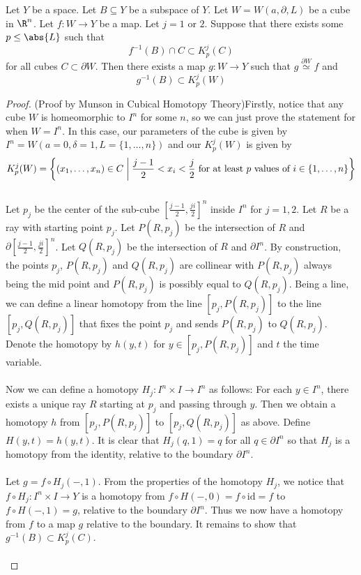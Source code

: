 \documentclass[a4paper]{article}
\begin{document}
\begin{lmm}{}{} Let $Y$ be a space. Let $B\subseteq Y$ be a subspace of $Y$. Let $W=W(a,\partial, L)$ be a cube in $\R^n$. Let $f:W\to Y$ be a map. Let $j=1$ or $2$. Suppose that there exists some $p\leq\abs{L}$ such that $$f^{-1}(B)\cap C\subset K_p^j(C)$$ for all cubes $C\subset\partial W$. Then there exists a map $g:W\to Y$ such that $g\overset{\partial W}{\simeq} f$ and $$g^{-1}(B)\subset K_p^j(W)$$ 
\begin{proof}
(Proof by Munson in Cubical Homotopy Theory)Firstly, notice that any cube $W$ is homeomorphic to $I^n$ for some $n$, so we can just prove the statement for when $W=I^n$. In this case, our parameters of the cube is given by $I^n=W(a=0,\delta=1,L=\{1,\dots,n\})$ and our $K_p^j(W)$ is given by $$K_p^j(W)=\left\{(x_1,\dots,x_n)\in C\;\bigg{|}\;\frac{j-1}{2}<x_i<\frac{j}{2}\text{ for at least }p\text{ values of }i\in\{1,\dots,n\}\right\}$$~\\

Let $p_j$ be the center of the sub-cube $\left[\frac{j-1}{2},\frac{ji}{2}\right]^n$ inside $I^n$ for $j=1,2$. Let $R$ be a ray with starting point $p_j$. Let $P(R,p_j)$ be the intersection of $R$ and $\partial\left[\frac{j-1}{2},\frac{ji}{2}\right]^n$. Let $Q(R,p_j)$ be the intersection of $R$ and $\partial I^n$. By construction, the points $p_j$, $P(R,p_j)$ and $Q(R,p_j)$ are collinear with $P(R,p_j)$ always being the mid point and $P(R,p_j)$ is possibly equal to $Q(R,p_j)$. Being a line, we can define a linear homotopy from the line $[p_j,P(R,p_j)]$ to the line $[p_j,Q(R,p_j)]$ that fixes the point $p_j$ and sends $P(R,p_j)$ to $Q(R,p_j)$. Denote the homotopy by $h(y,t)$ for $y\in[p_j,P(R,p_j)]$ and $t$ the time variable. \\~\\

Now we can define a homotopy $H_j:I^n\times I\to I^n$ as follows: For each $y\in I^n$, there exists a unique ray $R$ starting at $p_j$ and passing through $y$. Then we obtain a homotopy $h$ from $[p_j,P(R,p_j)]$ to $[p_j,Q(R,p_j)]$ as above. Define $H(y,t)=h(y,t)$. It is clear that $H_j(q,1)=q$ for all $q\in\partial I^n$ so that $H_j$ is a homotopy from the identity, relative to the boundary $\partial I^n$. \\~\\

Let $g=f\circ H_j(-,1)$. From the properties of the homotopy $H_j$, we notice that $f\circ H_j:I^n\times I\to Y$ is a homotopy from $f\circ H(-,0)=f\circ\text{id}=f$ to $f\circ H(-,1)=g$, relative to the boundary $\partial I^n$. Thus we now have a homotopy from $f$ to a map $g$ relative to the boundary. It remains to show that $g^{-1}(B)\subset K_p^j(C)$. \\~\\


\end{proof}
\end{lmm}
\end{document}
